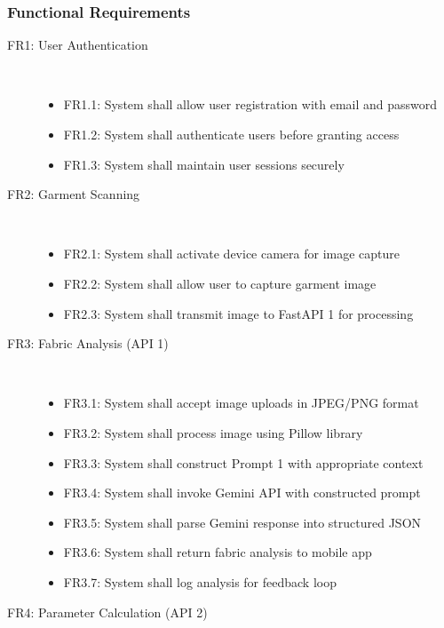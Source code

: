 \subsubsection{Functional Requirements}
\begin{description}
    \item[FR1: User Authentication] \hfill \\
        \begin{itemize}
            \item FR1.1: System shall allow user registration with email and password
            \item FR1.2: System shall authenticate users before granting access
            \item FR1.3: System shall maintain user sessions securely
        \end{itemize}
    \item[FR2: Garment Scanning] \hfill \\
        \begin{itemize}
            \item FR2.1: System shall activate device camera for image capture
            \item FR2.2: System shall allow user to capture garment image
            \item FR2.3: System shall transmit image to FastAPI 1 for processing
        \end{itemize}
    \item[FR3: Fabric Analysis (API 1)] \hfill \\
        \begin{itemize}
            \item FR3.1: System shall accept image uploads in JPEG/PNG format
            \item FR3.2: System shall process image using Pillow library
            \item FR3.3: System shall construct Prompt 1 with appropriate context
            \item FR3.4: System shall invoke Gemini API with constructed prompt
            \item FR3.5: System shall parse Gemini response into structured JSON
            \item FR3.6: System shall return fabric analysis to mobile app
            \item FR3.7: System shall log analysis for feedback loop
        \end{itemize}
    \item[FR4: Parameter Calculation (API 2)] \hfill \\

\end{description}
